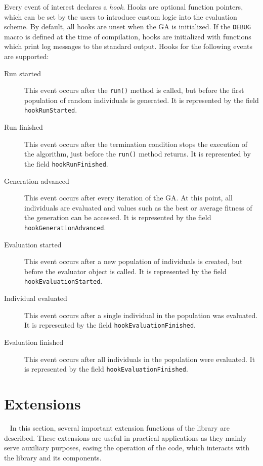 Every event of interest declares a \textit{hook}. Hooks are optional function pointers, which can be set by the users to introduce custom logic into the evaluation scheme. By default, all hooks are unset when the GA is initialized. If the \texttt{DEBUG} macro is defined at the time of compilation, hooks are initialized with functions which print log messages to the standard output. Hooks for the following events are supported:
~
\begin{description}
	\item[Run started]
	This event occurs after the \texttt{run()} method is called, but before the first population of random individuals is generated. It is represented by the field \texttt{hookRunStarted}.

	\item[Run finished]
	This event occurs after the termination condition stops the execution of the algorithm, just before the \texttt{run()} method returns. It is represented by the field \texttt{hookRunFinished}.

	\item[Generation advanced]
	This event occurs after every iteration of the GA. At this point, all individuals are evaluated and values such as the best or average fitness of the generation can be accessed. It is represented by the field \texttt{hookGenerationAdvanced}.

	\item[Evaluation started]
	This event occurs after a new population of individuals is created, but before the evaluator object is called. It is represented by the field \texttt{hookEvaluationStarted}.

	\item[Individual evaluated]
	This event occurs after a single individual in the population was evaluated. It is represented by the field \texttt{hookEvaluationFinished}.

	\item[Evaluation finished]
	This event occurs after all individuals in the population were evaluated. It is represented by the field \texttt{hookEvaluationFinished}.
\end{description}

\section{Extensions}~\label{section:extensions}
In this section, several important extension functions of the library are described. These extensions are useful in practical applications as they mainly serve auxiliary purposes, easing the operation of the code, which interacts with the library and its components.

